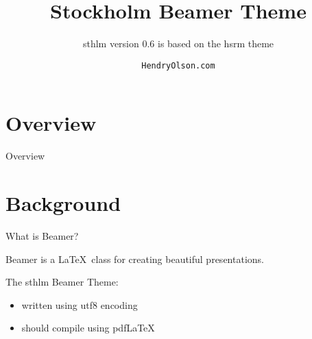 \documentclass[compress,PxFont]{beamer}
\title{Stockholm Beamer Theme}
\subtitle{sthlm version 0.6 is based on the hsrm theme}
\date{\small{\jobname}}
\author{\texttt{HendryOlson.com}}
\institute{Made in \textit{Sweden}}
\begin{document}
%
%

\maketitle


%
%

\section*{Overview}
\begin{frame}{Overview}
\tableofcontents[hideallsubsections]
\end{frame}

%
%

\section{Background}


\begin{frame}{What is Beamer?}

\centerline {Beamer is a \LaTeX\ class for creating beautiful presentations.}  

\begin{block}{The sthlm Beamer Theme:}
\begin{itemize}
	\item written using utf8 encoding
	\item should compile using pdfLaTeX
\end{itemize}
\end{block}

\end{frame}

%
%
\end{document}
